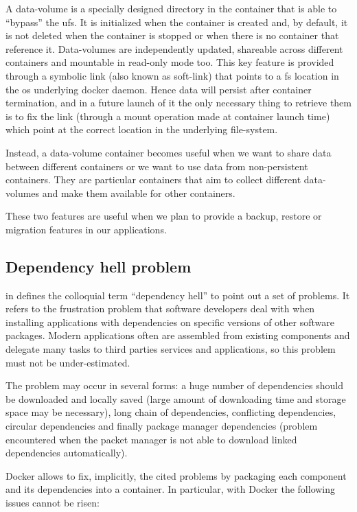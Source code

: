 A data-volume is a specially designed directory in the container that is able to “bypass” the \ac{ufs}.
It is initialized when the container is created and, by default, it is not deleted when the container
is stopped or when there is no container that reference it. Data-volumes are independently updated,
shareable across different containers and mountable in read-only mode too. This key feature is provided
through a symbolic link (also known as soft-link) that points to a \ac{fs} location in the \acs{os}
underlying docker daemon. Hence data will persist after container termination, and in a future launch
of it the only necessary thing to retrieve them is to fix the link (through a mount operation made at
container launch time) which point at the correct location in the underlying file-system.

Instead, a data-volume container becomes useful when we want to share data between different containers
or we want to use data from non-persistent containers. They are particular containers that aim to collect
different data-volumes and make them available for other containers.

These two features are useful when we plan to provide a backup, restore or migration features in our
applications.

\subsection{Dependency hell problem}
\label{sec:background-docker-dependencyHell}
\citeauthor{michaeljang2006} in \cite{michaeljang2006} defines the colloquial term “dependency hell” 
to point out a set of problems. It refers to the frustration problem that software developers deal with
when installing applications with dependencies on specific versions of other software packages. Modern
applications often are assembled from existing components and delegate many tasks to third parties services
and applications, so this problem must not be under-estimated.

The problem may occur in several forms: a huge number of dependencies should be downloaded and locally saved
(large amount of downloading time and storage space may be necessary), long chain of dependencies, conflicting 
dependencies, circular dependencies and finally package manager dependencies (problem encountered when 
the packet manager is not able to download linked dependencies automatically).

Docker allows to fix, implicitly, the cited problems by packaging each component and its dependencies
into a container. In particular, with Docker the following issues cannot be risen:

